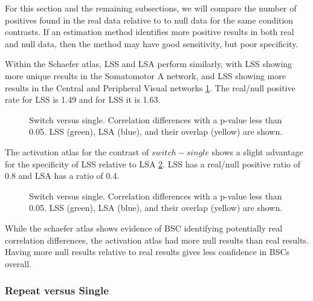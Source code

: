 \documentclass[10pt,letterpaper]{article}
\begin{document}
For this section and the remaining subsections, we will compare
the number of positives found in the real data relative to to null data for
the same condition contrasts.
If an estimation method identifies more positive results in both real and null data,
then the method may have good sensitivity, but poor specificity.

Within the Schaefer atlas, LSS and LSA perform similarly, with LSS showing more unique
results in the Somatomotor A network, and LSS showing more results in the Central
and Peripheral Visual networks \ref{fig:sch_switchvsingle}.
The real/null positive rate for LSS is 1.49 and for LSS it is 1.63.

\begin{figure}[H]
  \centering
  \caption{
    Switch versus single. Correlation differences with a p-value less than 0.05.
    LSS (green), LSA (blue), and their overlap (yellow) are shown.
  }
  \label{fig:sch_switchvsingle}
\end{figure}

The activation atlas for the contrast of $switch - single$
shows a slight advantage for the specificity of LSS relative to LSA \ref{fig:act_switchvsingle}.
LSS has a real/null positive ratio of 0.8 and LSA has a ratio of 0.4.

\begin{figure}[H]
  \centering
  \qquad
  \caption{
    Switch versus single. Correlation differences with a p-value less than 0.05.
    LSS (green), LSA (blue), and their overlap (yellow) are shown.
  }
  \label{fig:act_switchvsingle}
\end{figure}

While the schaefer atlas shows evidence of BSC
identifying potentially real correlation differences,
the activation atlas had more null results than real results.
Having more null results relative to real results gives less
confidence in BSCs overall.

\subsubsection*{Repeat versus Single}
\label{results:bsc-repeatXsingle}
\end{document}
